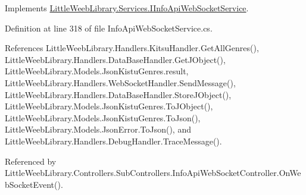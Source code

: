 Implements \mbox{\hyperlink{interface_little_weeb_library_1_1_services_1_1_i_info_api_web_socket_service_ab5db362889793db2a4371db323876cec}{Little\+Weeb\+Library.\+Services.\+I\+Info\+Api\+Web\+Socket\+Service}}.



Definition at line 318 of file Info\+Api\+Web\+Socket\+Service.\+cs.



References Little\+Weeb\+Library.\+Handlers.\+Kitsu\+Handler.\+Get\+All\+Genres(), Little\+Weeb\+Library.\+Handlers.\+Data\+Base\+Handler.\+Get\+J\+Object(), Little\+Weeb\+Library.\+Models.\+Json\+Kistu\+Genres.\+result, Little\+Weeb\+Library.\+Handlers.\+Web\+Socket\+Handler.\+Send\+Message(), Little\+Weeb\+Library.\+Handlers.\+Data\+Base\+Handler.\+Store\+J\+Object(), Little\+Weeb\+Library.\+Models.\+Json\+Kistu\+Genres.\+To\+J\+Object(), Little\+Weeb\+Library.\+Models.\+Json\+Kistu\+Genres.\+To\+Json(), Little\+Weeb\+Library.\+Models.\+Json\+Error.\+To\+Json(), and Little\+Weeb\+Library.\+Handlers.\+Debug\+Handler.\+Trace\+Message().



Referenced by Little\+Weeb\+Library.\+Controllers.\+Sub\+Controllers.\+Info\+Api\+Web\+Socket\+Controller.\+On\+Web\+Socket\+Event().


